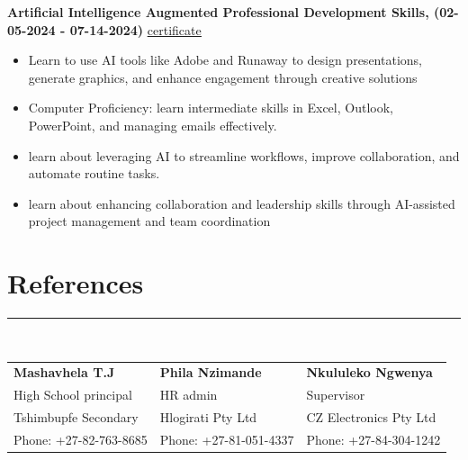 \documentclass[12pt]{article}
\begin{document}
\hspace{-7mm}\textbf{Artificial Intelligence Augmented Professional Development Skills, (02-05-2024 - 07-14-2024)} \hspace{10mm} \href{https://drive.google.com/file/d/16H-T0WN2AVSkl41QqBcLdgBtYbnxJytG/view?usp=sharing}{\underline{certificate}}
\vspace{-3mm}
\begin{itemize}
  \item Learn to use AI tools like Adobe and Runaway to design presentations, generate graphics, and enhance engagement through creative solutions
  \vspace{-3mm}
  \item Computer Proficiency: learn intermediate skills in Excel, Outlook, PowerPoint, and managing emails effectively.
  \vspace{-3mm}
  \item learn about leveraging AI to streamline workflows, improve collaboration, and automate routine tasks.
  \vspace{-3mm}
  \item learn about enhancing collaboration and leadership skills through AI-assisted project management and team coordination
  \vspace{-3mm}
\end{itemize}

\vspace{-3mm}\section*{\fontsize{14}{1}\selectfont\color{color_29791}References}\vspace{-9pt} 
\rule{\textwidth}{0.4pt}
\vspace{2pt}\\
\begin{tabular}{p{} p{} p{}}
  \textbf{Mashavhela T.J} & 
  \textbf{Phila Nzimande} & 
  \textbf{Nkululeko Ngwenya} \\
  High School principal & 
  HR admin& 
  Supervisor\\
  Tshimbupfe Secondary & 
  Hlogirati Pty Ltd& 
  CZ Electronics Pty Ltd\\ 
  Phone: +27-82-763-8685  & 
  Phone: +27-81-051-4337 & 
  Phone: +27-84-304-1242 \\
\end{tabular}
\end{document}
